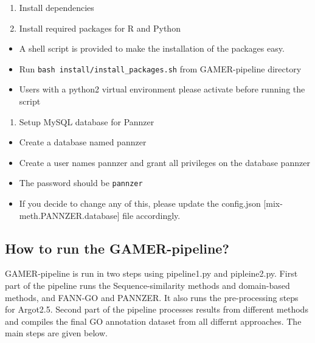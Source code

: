 \begin{enumerate}
 \def\labelenumi{\arabic{enumi}.}

 \item
       Install dependencies
 \item
       Install required packages for R and Python
\end{enumerate}

\begin{itemize}

 \item
       A shell script is provided to make the installation of the packages
       easy.
 \item
       Run \texttt{bash\ install/install\_packages.sh} from GAMER-pipeline
       directory
 \item
       Users with a python2 virtual environment please activate before
       running the script
\end{itemize}

\begin{enumerate}
 \def\labelenumi{\arabic{enumi}.}
 \setcounter{enumi}{2}

 \item
       Setup MySQL database for Pannzer
\end{enumerate}

\begin{itemize}

 \item
       Create a database named pannzer
 \item
       Create a user names pannzer and grant all privileges on the database
       pannzer
 \item
       The password should be \texttt{pannzer}
 \item
       If you decide to change any of this, please update the config.json
       {[}mix-meth.PANNZER.database{]} file accordingly.
\end{itemize}

\subsection{How to run the
 GAMER-pipeline?}\label{how-to-run-the-gamer-pipeline}

GAMER-pipeline is run in two steps using pipeline1.py and pipleine2.py.
First part of the pipeline runs the Sequence-similarity methods and
domain-based methods, and FANN-GO and PANNZER. It also runs the
pre-processing steps for Argot2.5. Second part of the pipeline processes
results from different methods and compiles the final GO annotation
dataset from all differnt approaches. The main steps are given below.

